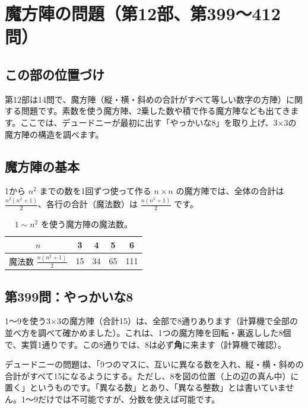 \documentclass[a4paper,11pt,openany]{ltjsbook}
\begin{document}
\chapter{魔方陣の問題（第12部、第399〜412問）}

\section{この部の位置づけ}

第12部は14問で、魔方陣（縦・横・斜めの合計がすべて等しい数字の方陣）に関する問題です。素数を使う魔方陣、2乗した数や積で作る魔方陣なども出てきます。ここでは、デュードニーが最初に出す「やっかいな8」を取り上げ、3×3の魔方陣の構造を調べます。

\section{魔方陣の基本}

1から $n^2$ までの数を1回ずつ使って作る $n\times n$ の魔方陣では、全体の合計は $\tfrac{n^2(n^2+1)}{2}$、各行の合計（魔法数）は $\tfrac{n(n^2+1)}{2}$ です。

\begin{table}[htbp]
\centering
\begin{tabular}{c|cccc}
\toprule
$n$ & 3 & 4 & 5 & 6\\
\midrule
魔法数 $\tfrac{n(n^2+1)}{2}$ & 15 & 34 & 65 & 111\\
\bottomrule
\end{tabular}
\caption{$1\sim n^2$ を使う魔方陣の魔法数。}
\end{table}

\section{第399問：やっかいな8}

1〜9を使う3×3の魔方陣（合計15）は、全部で8通りあります（計算機で全部の並べ方を調べて確かめました）。これは、1つの魔方陣を回転・裏返しした8個で、実質1通りです。この8通りでは、8は必ず\textbf{角}に来ます（計算機で確認）。

デュードニーの問題は、「9つのマスに、互いに異なる数を入れ、縦・横・斜めの合計がすべて15になるようにする。ただし、8を図の位置（上の辺の真ん中）に置く」というものです。「異なる数」とあり、「異なる整数」とは書いていません。1〜9だけでは不可能ですが、分数を使えば可能です。
\end{document}
